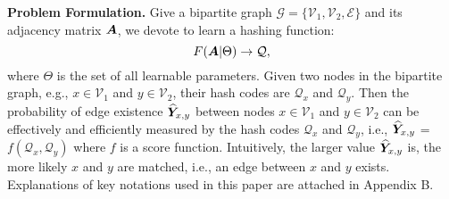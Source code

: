 

\noindent\textbf{Problem Formulation.}
Give a bipartite graph $\mathcal{G}=\{\mathcal{V}_1, \mathcal{V}_2, \mathcal{E}\}$ and its adjacency matrix $\boldsymbol{A}$, we devote to learn a hashing function:
\begin{equation}
\setlength\abovedisplayskip{2pt}
\setlength\belowdisplayskip{2pt}
F(\emb{A} | \Theta) \rightarrow \mathcal{Q},
\end{equation}
where $\Theta$ is the set of all learnable parameters. 
Given two nodes in the bipartite graph, e.g., $x\in \mathcal{V}_1$ and $y \in \mathcal{V}_2$, their hash codes are $\mathcal{Q}_x$ and $\mathcal{Q}_y$.
Then the probability of edge existence $\widehat{\boldsymbol{Y}}_{x,y}$ between nodes $x\in \mathcal{V}_1$ and $y \in \mathcal{V}_2$ can be effectively and efficiently measured by the hash codes $\mathcal{Q}_x$ and  $\mathcal{Q}_y$, i.e., $\widehat{\boldsymbol{Y}}_{x,y}$ = $f(\mathcal{Q}_x, \mathcal{Q}_y)$ where $f$ is a score function.
Intuitively, the larger value $\widehat{\boldsymbol{Y}}_{x,y}$ is, the more likely $x$ and $y$ are matched, i.e., an edge between $x$ and $y$ exists.
Explanations of key notations used in this paper are attached in Appendix B.








